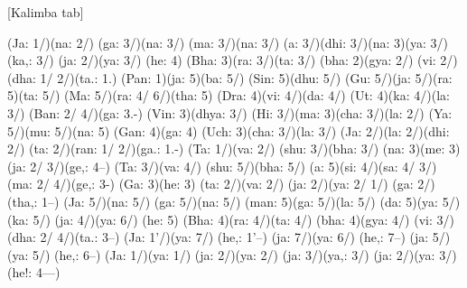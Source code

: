 \documentclass[11pt]{article}
\begin{document}
[Kalimba tab]
\begin{jianpu}
(Ja: 1/)(na: 2/) (ga: 3/)(na: 3/) (ma: 3/)(na: 3/) (a: 3/)(dhi: 3/)(na: 3)(ya: 3/)(ka,: 3/) (ja: 2/)(ya: 3/) (he: 4)
(Bha: 3)(ra: 3/)(ta: 3/) (bha: 2)(gya: 2/) (vi: 2/)(dha: 1/ 2/)(ta.: 1.)
(Pan: 1)(ja: 5)(ba: 5/) (Sin: 5)(dhu: 5/) (Gu: 5/)(ja: 5/)(ra: 5)(ta: 5/) (Ma: 5/)(ra: 4/ 6/)(tha: 5)
(Dra: 4)(vi: 4/)(da: 4/) (Ut: 4)(ka: 4/)(la: 3/) (Ban: 2/ 4/)(ga: 3.-)
(Vin: 3)(dhya: 3/) (Hi: 3/)(ma: 3)(cha: 3/)(la: 2/) (Ya: 5/)(mu: 5/)(na: 5) (Gan: 4)(ga: 4)
(Uch: 3)(cha: 3/)(la: 3/) (Ja: 2/)(la: 2/)(dhi: 2/) (ta: 2/)(ran: 1/ 2/)(ga.: 1.-)
(Ta: 1/)(va: 2/) (shu: 3/)(bha: 3/) (na: 3)(me: 3) (ja: 2/ 3/)(ge,: 4--)
(Ta: 3/)(va: 4/) (shu: 5/)(bha: 5/) (a: 5)(si: 4/)(sa: 4/ 3/) (ma: 2/ 4/)(ge,: 3-)
(Ga: 3)(he: 3) (ta: 2/)(va: 2/) (ja: 2/)(ya: 2/ 1/) (ga: 2/)(tha,: 1--)
(Ja: 5/)(na: 5/) (ga: 5/)(na: 5/) (man: 5)(ga: 5/)(la: 5/) (da: 5)(ya: 5/)(ka: 5/) (ja: 4/)(ya: 6/) (he: 5)
(Bha: 4)(ra: 4/)(ta: 4/) (bha: 4)(gya: 4/) (vi: 3/)(dha: 2/ 4/)(ta.: 3--)
(Ja: 1'/)(ya: 7/) (he,: 1'--) (ja: 7/)(ya: 6/) (he,: 7--) (ja: 5/)(ya: 5/) (he,: 6--)
(Ja: 1/)(ya: 1/) (ja: 2/)(ya: 2/) (ja: 3/)(ya,: 3/) (ja: 2/)(ya: 3/) (he!: 4---)
\end{jianpu}
\end{document}
